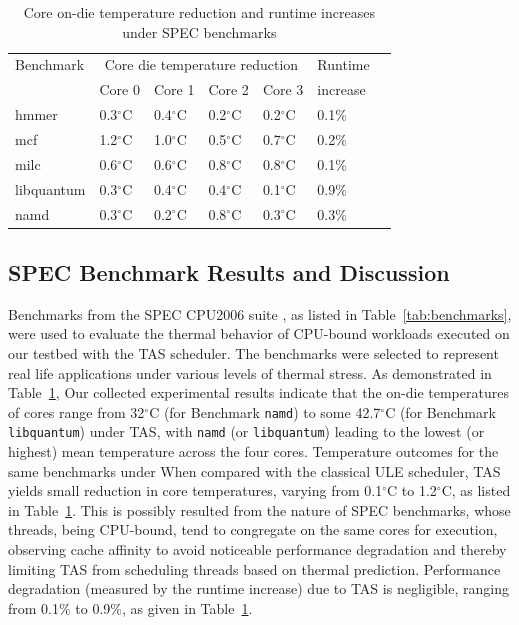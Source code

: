 \documentclass[times, 10pt,twocolumn]{IEEEtran}
\begin{document}
\begin{small}
\begin{table}[!bp] 
\centering
\caption{Core on-die temperature reduction and runtime increases under SPEC benchmarks}
\label{tab:specres} 
\begin{tabular}{lllllll} 
\hline
\hline
Benchmark & \multicolumn{4}{c}{Core die temperature reduction} & Runtime\\
 & Core 0 & Core 1 & Core 2  & Core 3 & increase \\
\hline
hmmer      & 0.3$^{\circ}$C & 0.4$^{\circ}$C & 0.2$^{\circ}$C & 0.2$^{\circ}$C & 0.1\% \\
mcf        & 1.2$^{\circ}$C & 1.0$^{\circ}$C & 0.5$^{\circ}$C & 0.7$^{\circ}$C & 0.2\% \\
milc       & 0.6$^{\circ}$C & 0.6$^{\circ}$C & 0.8$^{\circ}$C & 0.8$^{\circ}$C & 0.1\% \\
libquantum & 0.3$^{\circ}$C & 0.4$^{\circ}$C & 0.4$^{\circ}$C & 0.1$^{\circ}$C & 0.9\% \\
namd       & 0.3$^{\circ}$C & 0.2$^{\circ}$C & 0.8$^{\circ}$C & 0.3$^{\circ}$C & 0.3\% \\
\hline
\end{tabular}
\end{table}
\end{small} 
\subsection{SPEC Benchmark Results and Discussion}
\label{sec:microarch} 
Benchmarks from the SPEC CPU2006 suite \cite{Spec2006}, as listed in
Table~\ref{tab:benchmarks}, were used to evaluate the thermal behavior
of CPU-bound workloads executed on our testbed with the TAS scheduler.
The benchmarks were selected to represent real life applications under
various levels of thermal stress.  
As demonstrated in Table~\ref{tab:specres}, 
Our collected experimental results indicate that the on-die
temperatures of cores range from 32$^\circ$C (for Benchmark \texttt{namd}) to some 42.7$^\circ$C (for Benchmark \texttt{libquantum}) under TAS, with \texttt{namd} (or \texttt{libquantum}) leading to the lowest (or highest) mean temperature across the four cores. 
Temperature outcomes for the same benchmarks under 
When compared with the classical ULE scheduler, TAS yields small reduction in core temperatures, varying from
0.1$^\circ$C to 1.2$^\circ$C, as listed in
Table~\ref{tab:specres}.  This is possibly resulted from the
nature of SPEC benchmarks, whose threads, being CPU-bound, tend to
congregate on the same cores for execution, observing cache affinity to
avoid noticeable performance degradation and thereby limiting TAS from
scheduling threads based on thermal prediction.
Performance degradation (measured by the runtime increase)
due to TAS is negligible, ranging from 0.1\% to 0.9\%,
as given in Table~\ref{tab:specres}.
\end{document}
